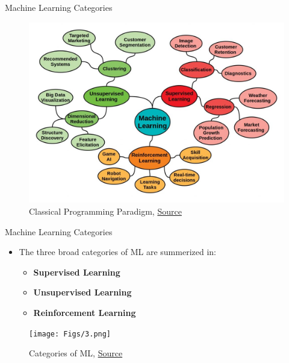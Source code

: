 \documentclass[compress,oilve]{beamer}
\begin{document}
\begin{frame}{Machine Learning Categories}

\begin{figure}
	\centering
	\includegraphics[scale=0.35]{Figs/27}
	\caption{Classical Programming Paradigm, \href{https://tinyurl.com/2zldw3my}{Source}}
\end{figure}
\end{frame}


\begin{frame}{Machine Learning Categories}
	\begin{itemize}
	\item The three broad categories of ML are summerized in:
		\begin{itemize}
		\item \textbf{Supervised Learning}
		\item \textbf{Unsupervised Learning}  
		\item \textbf{Reinforcement Learning} 
		\end{itemize}
	\end{itemize}
	\begin{figure}
		\texttt{[image: Figs/3.png]}
		\caption{Categories of ML, \href{https://tinyurl.com/2mq9ca3s}{Source}}
	\end{figure}
\end{frame}

\end{document}
